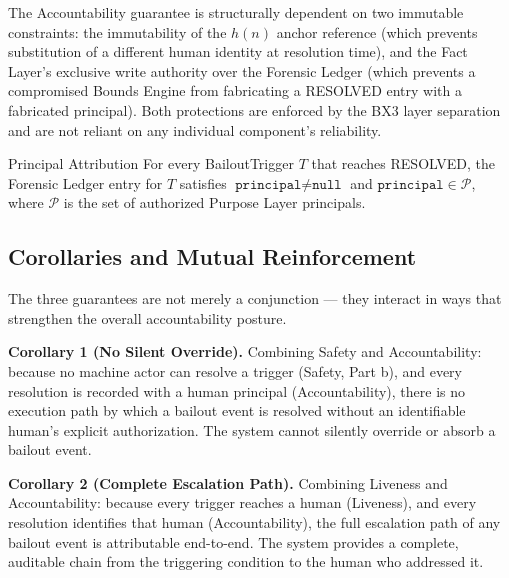 \bigskip

The Accountability guarantee is structurally dependent on two immutable constraints: the immutability of the $h(n)$ anchor reference (which prevents substitution of a different human identity at resolution time), and the Fact Layer's exclusive write authority over the Forensic Ledger (which prevents a compromised Bounds Engine from fabricating a RESOLVED entry with a fabricated principal). Both protections are enforced by the BX3 layer separation and are not reliant on any individual component's reliability.

\begin{invariant}{Principal Attribution}
\label{inv:principal-attribution}
For every BailoutTrigger $T$ that reaches RESOLVED, the Forensic Ledger entry for $T$ satisfies $\texttt{principal} \neq \texttt{null}$ and $\texttt{principal} \in \mathcal{P}$, where $\mathcal{P}$ is the set of authorized Purpose Layer principals.
\end{invariant}

\subsection{Corollaries and Mutual Reinforcement}
\label{sec:guarantee-corollaries}

The three guarantees are not merely a conjunction — they interact in ways that strengthen the overall accountability posture.

\medskip

\noindent\textbf{Corollary 1 (No Silent Override).} Combining Safety and Accountability: because no machine actor can resolve a trigger (Safety, Part b), and every resolution is recorded with a human principal (Accountability), there is no execution path by which a bailout event is resolved without an identifiable human's explicit authorization. The system cannot silently override or absorb a bailout event.

\medskip

\noindent\textbf{Corollary 2 (Complete Escalation Path).} Combining Liveness and Accountability: because every trigger reaches a human (Liveness), and every resolution identifies that human (Accountability), the full escalation path of any bailout event is attributable end-to-end. The system provides a complete, auditable chain from the triggering condition to the human who addressed it.

\medskip

